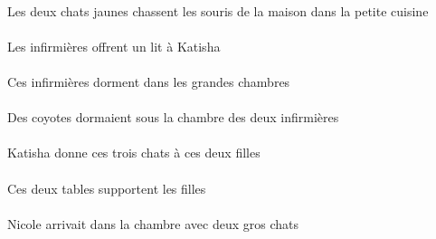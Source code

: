 \begin{exe}
\DEFDuErgP{}   \jauneDDuP{}   \chatDDuErgP{}    \DEFSgOblP{}   \petitDSgP{}   \cuisineDSgOblP{}   \DANSP{}   \DEFPlAbsP{}    \DEFSgOblP{}   \maisonDSgOblP{}   \DEP{}   \sourisBPlAbsP{}  \chasserVtPrsBPlP{}\\
Les deux chats jaunes chassent les souris de la maison dans la petite cuisine
\ex\gll
\DEFPlErg{}   \infirmiereAPlErg{}    \INDSgDat{}   \KatishaASgDat{}   \INDSgAbs{}   \litDSgAbs{}  \offrirVdPrsDSg{}\\
\DEFPlErgP{}   \infirmiereAPlErgP{}    \INDSgDatP{}   \KatishaASgDatP{}   \INDSgAbsP{}   \litDSgAbsP{}  \offrirVdPrsDSgP{}\\
Les infirmières offrent un lit à Katisha
\ex\gll
\DEMPlAbs{}   \infirmiereAPlAbs{}    \DEFPlObl{}   \grandBPl{}   \chambreBPlObl{}   \DANS{}  \dormirViPrsAPl{}\\
\DEMPlAbsP{}   \infirmiereAPlAbsP{}    \DEFPlOblP{}   \grandBPlP{}   \chambreBPlOblP{}   \DANSP{}  \dormirViPrsAPlP{}\\
Ces infirmières dorment dans les grandes chambres
\ex\gll
\DEFSgObl{}    \DEFDuObl{}   \infirmiereADuObl{}   \DE{}   \chambreBSgObl{}   \SOUS{}   \INDPlAbs{}   \coyoteCPlAbs{}  \dormirViPstCPl{}\\
\DEFSgOblP{}    \DEFDuOblP{}   \infirmiereADuOblP{}   \DEP{}   \chambreBSgOblP{}   \SOUSP{}   \INDPlAbsP{}   \coyoteCPlAbsP{}  \dormirViPstCPlP{}\\
Des coyotes dormaient sous la chambre des deux infirmières
\ex\gll
\INDSgErg{}   \KatishaASgErg{}    \DEMDuDat{}   \filleCDuDat{}   \DEMPlAbs{}   \troisDPl{}   \chatDPlAbs{}  \donnerVdPrsDPl{}\\
\INDSgErgP{}   \KatishaASgErgP{}    \DEMDuDatP{}   \filleCDuDatP{}   \DEMPlAbsP{}   \troisDPlP{}   \chatDPlAbsP{}  \donnerVdPrsDPlP{}\\
Katisha donne ces trois chats à ces deux filles
\ex\gll
\DEMDuErg{}   \tableDDuErg{}   \DEFPlAbs{}   \filleCPlAbs{}  \supporterVtPrsCPl{}\\
\DEMDuErgP{}   \tableDDuErgP{}   \DEFPlAbsP{}   \filleCPlAbsP{}  \supporterVtPrsCPlP{}\\
Ces deux tables supportent les filles
\ex\gll
\INDDuObl{}   \grosDDu{}   \chatDDuObl{}   \AVEC{}   \INDSgAbs{}   \NicoleBSgAbs{}    \DEFSgObl{}   \chambreBSgObl{}   \DANS{}  \arriverViPstBSg{}\\
\INDDuOblP{}   \grosDDuP{}   \chatDDuOblP{}   \AVECP{}   \INDSgAbsP{}   \NicoleBSgAbsP{}    \DEFSgOblP{}   \chambreBSgOblP{}   \DANSP{}  \arriverViPstBSgP{}\\
Nicole arrivait dans la chambre avec deux gros chats

\end{exe}
